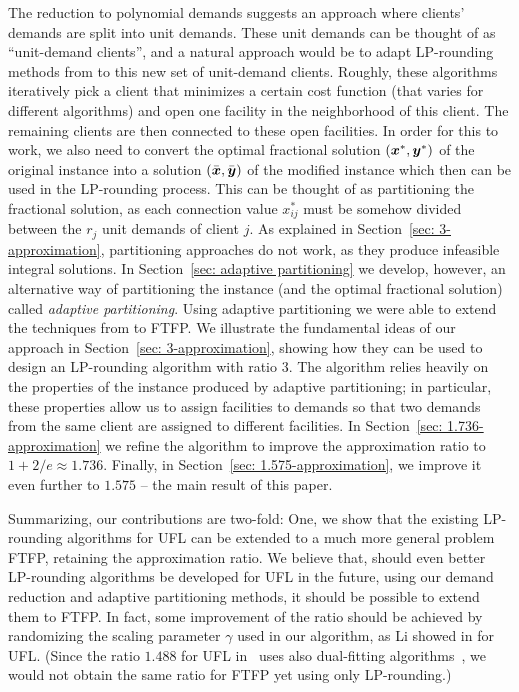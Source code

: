 \documentclass[11pt]{article}
\begin{document}
The reduction to polynomial demands suggests an approach
where clients' demands are split into unit demands. These
unit demands can be thought of as ``unit-demand clients'',
and a natural approach would be to adapt LP-rounding methods
from \cite{gupta08,ChudakS04,ByrkaGS10} to this new set of
unit-demand clients.  Roughly, these algorithms iteratively
pick a client that minimizes a certain cost function (that
varies for different algorithms) and open one facility in
the neighborhood of this client. The remaining clients are
then connected to these open facilities.  In order for this
to work, we also need to convert the optimal fractional
solution $(\boldsymbol{x}^\ast,\boldsymbol{y}^\ast)$ of the original instance
into a solution $(\bar{\boldsymbol{x}},\bar{\boldsymbol{y}})$ of the modified instance
which then can be used in the LP-rounding process. This can
be thought of as partitioning the fractional solution, as
each connection value $x^\ast_{ij}$ must be somehow divided
between the $r_j$ unit demands of client $j$.  As explained
in Section~\ref{sec: 3-approximation}, {\naive}
partitioning approaches do not work, as they produce
infeasible integral solutions.  In Section~\ref{sec: adaptive partitioning} we
develop, however, an alternative way of partitioning the
instance (and the optimal fractional solution) called
\emph{adaptive partitioning}. Using adaptive partitioning we
were able to extend the techniques from
\cite{gupta08,ChudakS04,ByrkaGS10} to FTFP.  We illustrate
the fundamental ideas of our approach in Section~\ref{sec: 3-approximation}, 
showing how they can be used to design
an LP-rounding algorithm with ratio $3$. The algorithm
relies heavily on the properties of the instance produced by
adaptive partitioning; in particular, these properties allow
us to assign facilities to demands so that two demands from
the same client are assigned to different facilities.  In
Section~\ref{sec: 1.736-approximation} we refine the
algorithm to improve the approximation ratio to
$1+2/e\approx 1.736$.  Finally, in Section~\ref{sec:
  1.575-approximation}, we improve it even further to
$1.575$ -- the main result of this paper.

Summarizing, our contributions are two-fold: One, we show
that the existing LP-rounding algorithms for UFL can be
extended to a much more general problem FTFP, retaining the
approximation ratio. We believe that, should even better
LP-rounding algorithms be developed for UFL in the future,
using our demand reduction and adaptive partitioning
methods, it should be possible to extend them to FTFP.
In fact, some improvement of the ratio
should be achieved by randomizing the scaling parameter
$\gamma$ used in our algorithm, as Li showed in \cite{Li11}
for UFL.  (Since the ratio $1.488$ for UFL in~\cite{Li11}
uses also dual-fitting
algorithms~\cite{MahdianYZ06}, we would not obtain the same
ratio for FTFP yet using only LP-rounding.)
\end{document}

